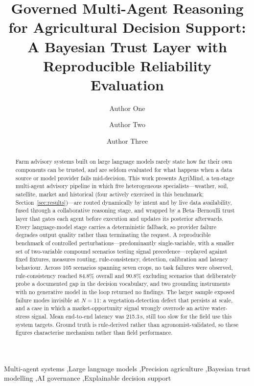 \documentclass[preprint,12pt]{elsarticle}
\begin{document}
\begin{frontmatter}

\title{Governed Multi-Agent Reasoning for Agricultural Decision Support:
A Bayesian Trust Layer with Reproducible Reliability Evaluation}

\author[label1]{Author One}
\author[label1]{Author Two}
\author[label1]{Author Three}



\begin{abstract}
Farm advisory systems built on large language models rarely state how far
their own components can be trusted, and are seldom evaluated for what
happens when a data source or model provider fails mid-decision. This work
presents AgriMind, a ten-stage multi-agent advisory pipeline in which five
heterogeneous specialists---weather, soil, satellite, market and
historical (four actively exercised in this benchmark; Section~\ref{sec:results})---are
routed dynamically by intent and by live data
availability, fused through a collaborative reasoning stage, and wrapped by
a Beta--Bernoulli trust layer that gates each agent before execution and
updates its posterior afterwards. Every language-model stage carries a
deterministic fallback, so provider failure degrades output quality rather
than terminating the request. A reproducible benchmark of controlled
perturbations---predominantly single-variable, with a smaller set of
two-variable compound scenarios testing signal precedence---replayed
against fixed fixtures, measures routing, rule-consistency, detection,
calibration and latency behaviour.
Across 105 scenarios spanning seven crops, no task failures were observed,
rule-consistency reached 84.8\% overall and 90.8\% excluding scenarios that
deliberately probe a documented gap in the decision vocabulary, and two
grounding instruments with no generative model in the loop returned no
findings. The larger sample exposed failure modes invisible at $N=11$: a
vegetation-detection defect that persists at scale, and a case in which a
market-opportunity signal wrongly overrode an active water-stress signal.
Mean end-to-end latency was 215.3\,s, still too slow for the field use this
system targets. Ground truth is
rule-derived rather than agronomist-validated, so these figures
characterise mechanism rather than field performance.
\end{abstract}

\begin{keyword}
Multi-agent systems \sep Large language models \sep Precision agriculture
\sep Bayesian trust modelling \sep AI governance \sep Explainable decision support
\end{keyword}

\end{frontmatter}
\end{document}
